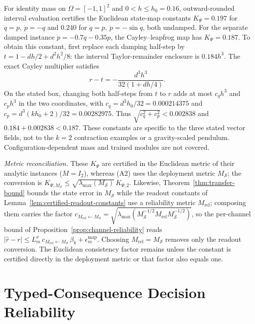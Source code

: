 \begin{remark}
\label{rem:certified-KPsi}
For identity mass on $\Omega=[-1,1]^2$ and $0<h\le h_0=0.16$, outward-rounded interval evaluation certifies the Euclidean state-map constants $K_\Psi=0.197$ for $\dot q=p,\ \dot p=-q$ and $0.240$ for $\dot q=p,\ \dot p=-\sin q$, both undamped.
For the separate damped instance $\dot p=-0.7q-0.35p$, the Cayley--leapfrog map has $K_\Psi=0.187$. To obtain this constant, first replace each damping half-step by $t=1-dh/2+d^2h^2/8$: the interval Taylor-remainder enclosure is $0.184h^3$. The exact Cayley multiplier satisfies
\[
 r-t=-\frac{d^3h^3}{32(1+dh/4)}.
\]
On the stated box, changing both half-steps from $t$ to $r$ adds at most $c_qh^3$ and $c_ph^3$ in the two coordinates, with $c_q=d^3h_0/32=0.000214375$ and $c_p=d^3(kh_0+2)/32=0.00282975$. Thus $\sqrt{c_q^2+c_p^2}<0.002838$ and $0.184+0.002838<0.187$. These constants are specific to the three stated vector fields, not to the $k=2$ contraction examples or a gravity-scaled pendulum. Configuration-dependent mass and trained modules are not covered.

\emph{Metric reconciliation.} These $K_\Psi$ are certified in the Euclidean metric of their analytic instances ($M=I_2$), whereas (A2) uses the deployment metric $M_{\mathcal S}$; the conversion is $K_{\Psi,M_{\mathcal S}}\le\sqrt{\lambda_{\max}(M_{\mathcal S})}\,K_{\Psi,2}$. Likewise, Theorem~\ref{thm:transfer-bound} bounds the state error in $M_{\mathcal S}$ while the readout constants of Lemma~\ref{lem:certified-readout-constants} use a reliability metric $M_{\mathrm{rel}}$; composing them carries the factor $c_{M_{\mathrm{rel}}\leftarrow M_{\mathcal S}}=\sqrt{\lambda_{\max}(M_{\mathcal S}^{-1/2}M_{\mathrm{rel}}M_{\mathcal S}^{-1/2})}$, so the per-channel bound of Proposition~\ref{prop:channel-reliability} reads $\lvert\hat r-r\rvert\le L_m^{x}\,c_{M_{\mathrm{rel}}\leftarrow M_{\mathcal S}}\,\beta_k+\epsilon_m^{\mathrm{map}}$. Choosing $M_{\mathrm{rel}}=M_{\mathcal S}$ removes only the readout conversion. The Euclidean consistency factor remains unless the constant is certified directly in the deployment metric or that factor also equals one.
\end{remark}

\section{Typed-Consequence Decision Reliability}
\label{app:decision-reliability}

